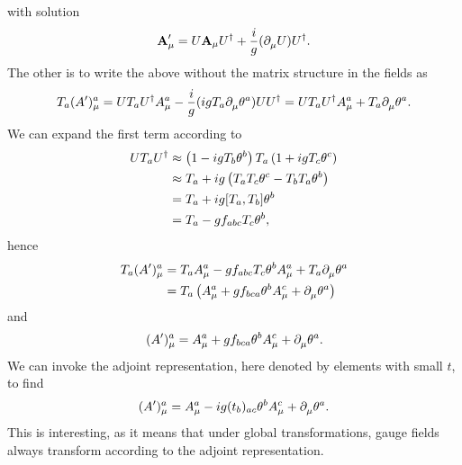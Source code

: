 with solution
\begin{align*}
	\textbf{A}^{\prime}_{\mu} = U\textbf{A}_{\mu}U^{\dagger} + \frac{i}{g}(\partial^{}_{\mu}U)U^{\dagger}.
\end{align*}
The other is to write the above without the matrix structure in the fields as
\begin{align*}
	T_{a}(A^{\prime})_{\mu}^{a} = UT_{a}U^{\dagger} A_{\mu}^{a} - \frac{i}{g}(igT_{a}\partial^{}_{\mu}\theta^{a})UU^{\dagger} = UT_{a}U^{\dagger} A_{\mu}^{a} + T_{a}\partial^{}_{\mu}\theta^{a}.
\end{align*}
We can expand the first term according to
\begin{align*}
	UT_{a}U\adj &\approx \left(1 - igT_{b}\theta^{b}\right)T_{a}\left(1 + igT_{c}\theta^{c}\right) \\
	            &\approx T_{a} + ig\left(T_{a}T_{c}\theta^{c} - T_{b}T_{a}\theta^{b}\right) \\
	            &= T_{a} + ig\comm{T_{a}}{T_{b}}\theta^{b} \\
	            &= T_{a} - gf_{abc}T_{c}\theta^{b},
\end{align*}
hence
\begin{align*}
	T_{a}(A^{\prime})_{\mu}^{a} &= T_{a}A_{\mu}^{a} - gf_{abc}T_{c}\theta^{b}A_{\mu}^{a} + T_{a}\partial^{}_{\mu}\theta^{a} \\
	                     &= T_{a}\left(A_{\mu}^{a} + gf_{bca}\theta^{b}A_{\mu}^{c} + \partial^{}_{\mu}\theta^{a}\right)
\end{align*}
and
\begin{align*}
	(A^{\prime})_{\mu}^{a} = A_{\mu}^{a} + gf_{bca}\theta^{b}A_{\mu}^{c} + \partial^{}_{\mu}\theta^{a}.
\end{align*}
We can invoke the adjoint representation, here denoted by elements with small $t$, to find
\begin{align*}
	(A^{\prime})_{\mu}^{a} = A_{\mu}^{a} - ig(t_{b})_{ac}\theta^{b}A_{\mu}^{c} + \partial^{}_{\mu}\theta^{a}.
\end{align*}
This is interesting, as it means that under global transformations, gauge fields always transform according to the adjoint representation.

